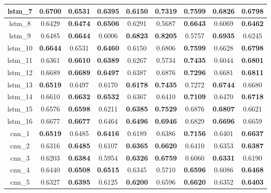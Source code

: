 \begin{table}[h]
\begin{tabular} {|c|c|c|c|c|c|c|c|c| }
    lstm\_7   & \textbf{0.6700} & 0.6531 & \textbf{0.6395} & 0.6150 & 0.7319 & \textbf{0.7599} & \textbf{0.6826} & 0.6798 \\ \hline
    lstm\_8   & 0.6429 & \textbf{0.6474} & \textbf{0.6506} & 0.6291 & 0.5687 & \textbf{0.6643} & 0.6069 & \textbf{0.6462} \\ \hline
    lstm\_9   & 0.6485 & \textbf{0.6644} & 0.6006 & \textbf{\cellcolor{green!50}0.6823} & \textbf{\cellcolor{green!50}0.8205} & 0.5757 & \textbf{0.6935} & 0.6245 \\ \hline
    lstm\_10  & \textbf{0.6644} & 0.6531 & \textbf{0.6460} & 0.6150 & 0.6806 & \textbf{0.7599} & 0.6628 & \textbf{0.6798} \\ \hline
    lstm\_11  & 0.6361 & \textbf{0.6610} & \textbf{0.6389} & 0.6267 & 0.5734 & \textbf{0.7435} & 0.6044 & \textbf{0.6801} \\ \hline
    lstm\_12  & 0.6689 & \textbf{\cellcolor{green!50}0.6689} & \textbf{0.6497} & 0.6387 & 0.6876 & \textbf{0.7296} & 0.6681 & \textbf{0.6811} \\ \hline
    lstm\_13  & \textbf{0.6519} & 0.6497 & 0.6170 & \textbf{0.6178} & \textbf{0.7435} & 0.7272 & \textbf{0.6744} & 0.6680 \\ \hline
    lstm\_14  & 0.6610 & \textbf{0.6632} & \textbf{\cellcolor{green!50}0.6532} & 0.6367 & 0.6410 & \textbf{0.7109} & 0.6470 & \textbf{0.6718} \\ \hline
    lstm\_15  & 0.6576 & \textbf{0.6598} & 0.6211 & \textbf{0.6385} & \textbf{0.7529} & 0.6876 & \textbf{0.6807} & 0.6621 \\ \hline
    lstm\_16  & 0.6677 & \textbf{0.6677} & 0.6464 & \textbf{0.6496} & \textbf{0.6946} & 0.6829 & \textbf{0.6696} & 0.6659 \\ \hline
    cnn\_1    & \textbf{0.6519} & 0.6485 & \textbf{0.6416} & 0.6189 & 0.6386 & \textbf{0.7156} & 0.6401 & \textbf{0.6637} \\ \hline
    cnn\_2    & 0.6316 & \textbf{0.6485} & 0.6107 & \textbf{0.6365} & \textbf{0.6620} & 0.6410 & 0.6353 & \textbf{0.6387} \\ \hline
    cnn\_3    & 0.6203 & \textbf{0.6384} & 0.5954 & \textbf{0.6326} & \textbf{0.6759} & 0.6060 & \textbf{0.6331} & 0.6190 \\ \hline
    cnn\_4    & 0.6440 & \textbf{0.6508} & \textbf{0.6515} & 0.6345 & 0.5710 & \textbf{0.6596} & 0.6086 & \textbf{0.6468} \\ \hline
    cnn\_5    & 0.6327 & \textbf{0.6395} & 0.6125 & \textbf{0.6200} & 0.6596 & \textbf{0.6620} & 0.6352 & \textbf{0.6403} \\ \hline

\end{tabular}
\end{table}
